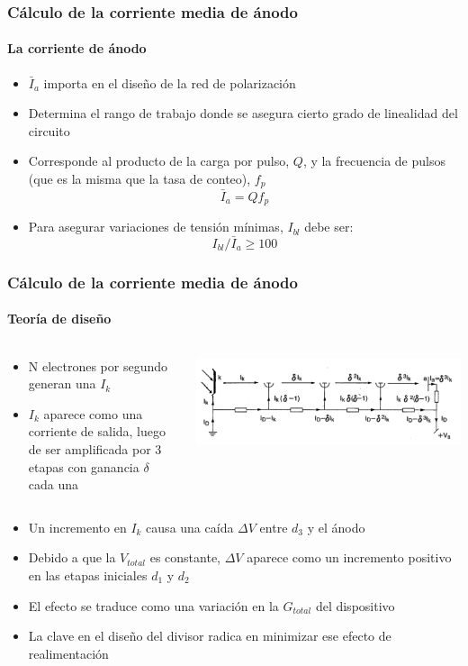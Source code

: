 \documentclass{beamer}
\begin{document}
\begin{frame}
\frametitle{Cálculo de la corriente media de ánodo}
\framesubtitle{La corriente de ánodo}
\begin{block}{}
\begin{itemize}
\item $\bar{I}_a$ importa en el diseño de la red de polarización
\item Determina el rango de trabajo donde se asegura cierto grado de
linealidad del circuito
\item Corresponde al producto de la carga por pulso, $Q$, y la
frecuencia de pulsos (que es la misma que la tasa de conteo), $f_p$
$$\bar{I}_a = Q f_p$$
\item Para asegurar variaciones de tensión mínimas, $I_{bl}$ debe ser:
$$I_{bl}/\bar{I}_a \geq 100$$ 
\end{itemize}
\end{block}
\end{frame} 

\begin{frame}
\frametitle{Cálculo de la corriente media de ánodo}
\framesubtitle{Teoría de diseño}
\begin{columns}
\begin{column}{0.5\textwidth}
\begin{itemize}
\item N electrones por segundo generan una $I_k$ 
\item $I_k$ aparece como una corriente de salida, luego de ser amplificada por 3
etapas con ganancia $\delta$ cada una
\end{itemize}
\end{column}
\begin{column}{0.5\textwidth}
\begin{center}
\includegraphics[width=\textwidth]{d1/voltage_div_3_dyn}
\end{center}
\end{column}
\end{columns}
\begin{itemize}
\item Un incremento en $I_k$ causa una caída $\Delta V$ entre $d_3$ y el ánodo
\item Debido a que la $V_{total}$ es constante, $\Delta V$ aparece como un
incremento positivo en las etapas iniciales $d_1$ y $d_2$
\item El efecto se traduce como una variación en la $G_{total}$ del dispositivo
\item \alert{La clave en el diseño del divisor radica en minimizar ese efecto de
realimentación}
\end{itemize}
\end{frame} 
\end{document}
